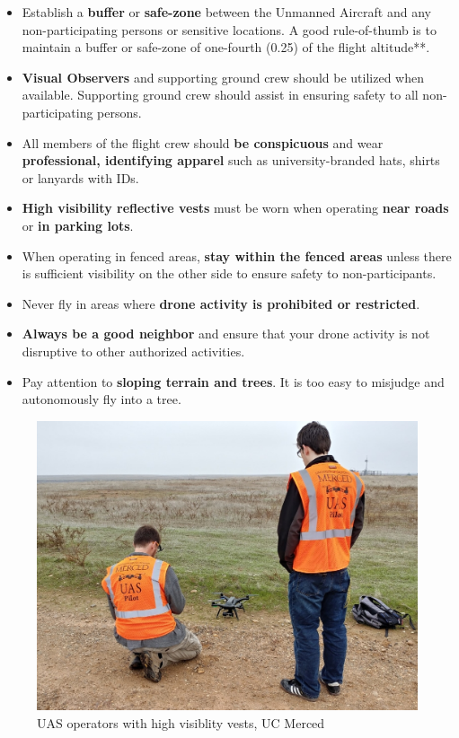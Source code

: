 \documentclass[
  12pt,
]{book}
\providecommand{\tightlist}{%
  \setlength{\itemsep}{0pt}\setlength{\parskip}{0pt}}
\begin{document}
\begin{itemize}
\tightlist
\item
  Establish a \textbf{buffer} or \textbf{safe-zone} between the Unmanned Aircraft and any non-participating persons or sensitive locations. A good rule-of-thumb is to maintain a buffer or safe-zone of one-fourth (0.25) of the flight altitude**.
\item
  \textbf{Visual Observers} and supporting ground crew should be utilized when available. Supporting ground crew should assist in ensuring safety to all non-participating persons.
\item
  All members of the flight crew should \textbf{be conspicuous} and wear \textbf{professional, identifying apparel} such as university-branded hats, shirts or lanyards with IDs.
\item
  \textbf{High visibility reflective vests} must be worn when operating \textbf{near roads} or \textbf{in parking lots}.\\
\item
  When operating in fenced areas, \textbf{stay within the fenced areas} unless there is sufficient visibility on the other side to ensure safety to non-participants.
\item
  Never fly in areas where \textbf{drone activity is prohibited or restricted}.
\item
  \textbf{Always be a good neighbor} and ensure that your drone activity is not disruptive to other authorized activities.
\item
  Pay attention to \textbf{sloping terrain and trees}. It is too easy to misjudge and autonomously fly into a tree.
\end{itemize}

\begin{figure}

{\centering \includegraphics[width=0.75\linewidth]{images/UAS_vest} 

}

\caption{UAS operators with high visiblity vests, UC Merced}\label{fig:hivis}
\end{figure}
\end{document}
